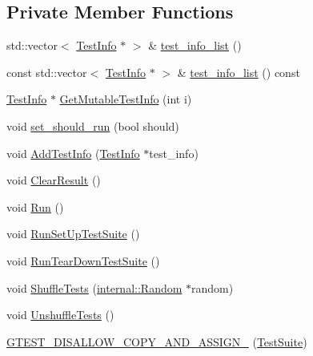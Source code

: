 \subsection*{Private Member Functions}
\begin{DoxyCompactItemize}
\item 
std\+::vector$<$ \hyperlink{classtesting_1_1TestInfo}{Test\+Info} $\ast$ $>$ \& \hyperlink{classtesting_1_1TestSuite_a9aae5da520bc0f25d67c948c0a5fa6b6}{test\+\_\+info\+\_\+list} ()
\item 
const std\+::vector$<$ \hyperlink{classtesting_1_1TestInfo}{Test\+Info} $\ast$ $>$ \& \hyperlink{classtesting_1_1TestSuite_aad784d4e25767e359e6bae1ef4196404}{test\+\_\+info\+\_\+list} () const
\item 
\hyperlink{classtesting_1_1TestInfo}{Test\+Info} $\ast$ \hyperlink{classtesting_1_1TestSuite_a7295cf0f654d5e9cd8a47d485e11396d}{Get\+Mutable\+Test\+Info} (int i)
\item 
void \hyperlink{classtesting_1_1TestSuite_a783c072998fdbdfd600221823cea1de1}{set\+\_\+should\+\_\+run} (bool should)
\item 
void \hyperlink{classtesting_1_1TestSuite_a9d8d94a589481923b7cf6c7ce3a48f8b}{Add\+Test\+Info} (\hyperlink{classtesting_1_1TestInfo}{Test\+Info} $\ast$test\+\_\+info)
\item 
void \hyperlink{classtesting_1_1TestSuite_a87bb26673c51e952e4904afcfa418c51}{Clear\+Result} ()
\item 
void \hyperlink{classtesting_1_1TestSuite_a16c6fb9e056f1d9113ca1e6eaf9b58bc}{Run} ()
\item 
void \hyperlink{classtesting_1_1TestSuite_a366c17f4d7a8c9130bfa2fc37d316e8b}{Run\+Set\+Up\+Test\+Suite} ()
\item 
void \hyperlink{classtesting_1_1TestSuite_adde3df6963a73760cfb53bbf69f47f29}{Run\+Tear\+Down\+Test\+Suite} ()
\item 
void \hyperlink{classtesting_1_1TestSuite_ab5c2055e93f43a2029e36adc5d75347a}{Shuffle\+Tests} (\hyperlink{classtesting_1_1internal_1_1Random}{internal\+::\+Random} $\ast$random)
\item 
void \hyperlink{classtesting_1_1TestSuite_afcf87bf5cf6bc373a286c0258ff39f8d}{Unshuffle\+Tests} ()
\item 
\hyperlink{classtesting_1_1TestSuite_a4b3b080cb92343fbd1611b621d63bbe9}{G\+T\+E\+S\+T\+\_\+\+D\+I\+S\+A\+L\+L\+O\+W\+\_\+\+C\+O\+P\+Y\+\_\+\+A\+N\+D\+\_\+\+A\+S\+S\+I\+G\+N\+\_\+} (\hyperlink{classtesting_1_1TestSuite}{Test\+Suite})
\end{DoxyCompactItemize}
